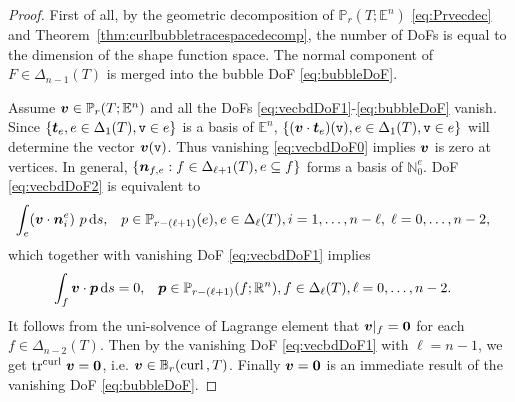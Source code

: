 \documentclass[10pt]{amsart}
\begin{document}
\begin{proof}
First of all, by the geometric decomposition of $ \mathbb P_r(T; \mathbb E^n)$ \eqref{eq:Prvecdec} and Theorem~\ref{thm:curlbubbletracespacedecomp}, %
the number of DoFs is equal to the dimension of the shape function space. The normal component of $F\in \Delta_{n-1}(T)$ is merged into the bubble DoF \eqref{eq:bubbleDoF}. 


Assume $\boldsymbol v\in\mathbb P_r(T; \mathbb E^n)$ and all the DoFs \eqref{eq:vecbdDoF1}-\eqref{eq:bubbleDoF} vanish. Since $\{\boldsymbol t_{e}, e\in \Delta_{1}(T), \texttt{v}\in e\}$ is a basis of $\mathbb E^n$, $\{(\boldsymbol v\cdot \boldsymbol t_{e})(\texttt{v}), e\in \Delta_{1}(T), \texttt{v}\in e\}$ will determine the vector $\boldsymbol v(\texttt{v})$. Thus vanishing \eqref{eq:vecbdDoF0} implies $\boldsymbol v$ is zero at vertices. In general, $\{\boldsymbol n_{f,e}: f\in \Delta_{\ell+1}(T), e\subseteq f\}$ forms a basis of $\mathbb N^e_0$. DoF \eqref{eq:vecbdDoF2} is equivalent to 
\begin{align*}
\int_e (\boldsymbol v\cdot \boldsymbol n_i^e)\ p \,{\rm d} s, &\quad  p\in \mathbb P_{r - (\ell +1)} (e), e\in \Delta_{\ell}(T), i=1,\ldots, n-\ell, \; \ell = 0,\ldots, n-2,
\end{align*}
which together with vanishing DoF \eqref{eq:vecbdDoF1} implies
\begin{align*}
\int_f \boldsymbol v\cdot \boldsymbol p \,{\rm d} s = 0, &\quad  \boldsymbol p\in \mathbb P_{r - (\ell +1)} (f;\mathbb R^n), f\in \Delta_{\ell}(T),  \ell = 0,\ldots, n-2.
\end{align*}
It follows from the uni-solvence of Lagrange element that $\boldsymbol v|_f=\boldsymbol0$ for each $f\in\Delta_{n-2}(T)$.
Then by the vanishing DoF \eqref{eq:vecbdDoF1} with $\ell=n-1$, we get $\operatorname{tr}^{{\rm curl\,}}\boldsymbol v=\boldsymbol0$, i.e. $\boldsymbol v\in\mathbb B_r({\rm curl\,}, T)$. Finally $\boldsymbol v=\boldsymbol0$ is an immediate result of the vanishing DoF \eqref{eq:bubbleDoF}.
\end{proof}
\end{document}
